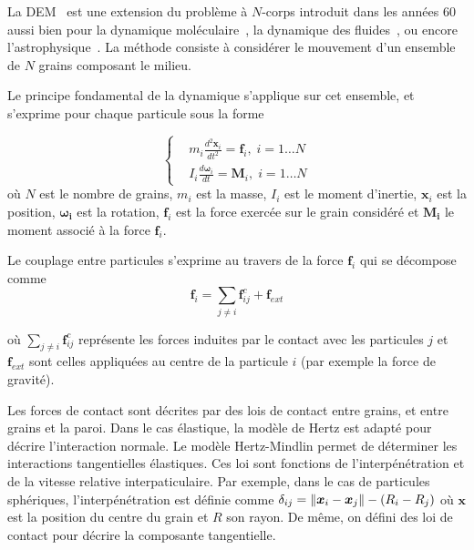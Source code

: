 La DEM~\cite{cundall_discrete_1979} est une extension du problème à $N$-corps introduit dans les années 60 aussi bien pour la dynamique moléculaire~\cite{Alder1959}, la dynamique des fluides~\cite{Allen1987}, ou encore l'astrophysique~\cite{vonHoerner1960}.
La méthode consiste à considérer le mouvement d'un ensemble de $N$ grains composant le milieu.

Le principe fondamental de la dynamique s'applique sur cet ensemble, et s'exprime pour chaque particule sous la forme

\begin{equation*}
    \left\{
    \begin{aligned}
         & m_{i} \frac{ d^{2}\bm{x}_i }{dt^2}=\bm{f}_{i},\; i=1\ldots N \\
         & I_{i} \frac{d \bm{\omega}_{i}}{dt}=\bm{M}_{i},\; i=1\ldots N
    \end{aligned}
    \right.
\end{equation*}où $N$ est le nombre de grains, $m_{i}$ est la masse, $I_i$ est le moment d'inertie, $\bm{x}_{i}$ est la position, $\bm{\omega_{i}}$ est la rotation, $\bm{f}_{i}$ est la force exercée sur le grain considéré et $\bm{M_{i}}$ le moment associé à la force $\bm{f}_{i}$.

Le couplage entre particules s'exprime au travers de la force $\bm{f}_{i}$ qui se décompose comme
\begin{equation*}
    \bm{f}_{i}=\underset{{\scriptstyle j\neq i}}{\sum}\bm{f}^{c}_{ij}+\bm{f}_{ext}
\end{equation*}

où $\underset{{\scriptstyle j\neq i}}{\sum}\bm{f}^{c}_{ij}$ représente les forces induites par le contact avec les particules $j$ et $\bm{f}_{ext}$ sont celles appliquées au centre de la particule $i$ (par exemple la force de gravité).

Les forces de contact sont décrites par des lois de contact entre grains, et entre grains et la paroi. Dans le cas élastique, la modèle de Hertz est adapté pour décrire l’interaction normale. Le modèle Hertz-Mindlin permet de déterminer les interactions tangentielles élastiques. Ces loi sont fonctions de l'interpénétration et de la vitesse relative interpaticulaire. Par exemple, dans le cas de particules sphériques, l'interpénétration est définie comme $\delta_{ij} = \left\lVert \bm x_i - \bm x_j \right\rVert - (R_i - R_j)$ où $\bm x$  est la position du centre du grain et $R$ son rayon. De même, on défini des loi de contact pour décrire la composante tangentielle.


